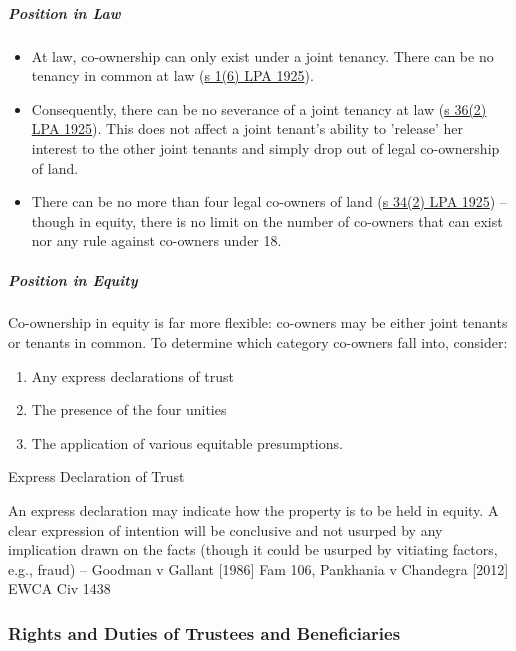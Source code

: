 \documentclass[
]{article}
\providecommand{\tightlist}{%
  \setlength{\itemsep}{0pt}\setlength{\parskip}{0pt}}
\begin{document}
\hypertarget{position-in-law}{%
\subparagraph{Position in Law}\label{position-in-law}}

\begin{itemize}
\tightlist
\item
  At law, co-ownership can only exist under a joint tenancy. There can
  be no tenancy in common at law
  (\href{https://www.legislation.gov.uk/ukpga/Geo5/15-16/20/section/1}{s
  1(6) LPA 1925}).
\item
  Consequently, there can be no severance of a joint tenancy at law
  (\href{https://www.legislation.gov.uk/ukpga/Geo5/15-16/20/section/36}{s
  36(2) LPA 1925}). This does not affect a joint tenant's ability to
  'release' her interest to the other joint tenants and simply drop out
  of legal co-ownership of land.
\item
  There can be no more than four legal co-owners of land
  (\href{https://www.legislation.gov.uk/ukpga/Geo5/15-16/20/section/34}{s
  34(2) LPA 1925}) -- though in equity, there is no limit on the number
  of co-owners that can exist nor any rule against co-owners under 18.
\end{itemize}

\hypertarget{position-in-equity}{%
\subparagraph{Position in Equity}\label{position-in-equity}}

Co-ownership in equity is far more flexible: co-owners may be either
joint tenants or tenants in common. To determine which category
co-owners fall into, consider:

\begin{enumerate}
\tightlist
\item
  Any express declarations of trust
\item
  The presence of the four unities
\item
  The application of various equitable presumptions.
\end{enumerate}

Express Declaration of Trust

An express declaration may indicate how the property is to be held in
equity. A clear expression of intention will be conclusive and not
usurped by any implication drawn on the facts (though it could be
usurped by vitiating factors, e.g., fraud) -- Goodman v Gallant
{[}1986{]} Fam 106, Pankhania v Chandegra {[}2012{]} EWCA Civ 1438

\hypertarget{rights-and-duties-of-trustees-and-beneficiaries}{%
\subsubsection{Rights and Duties of Trustees and
Beneficiaries}\label{rights-and-duties-of-trustees-and-beneficiaries}}
\end{document}
